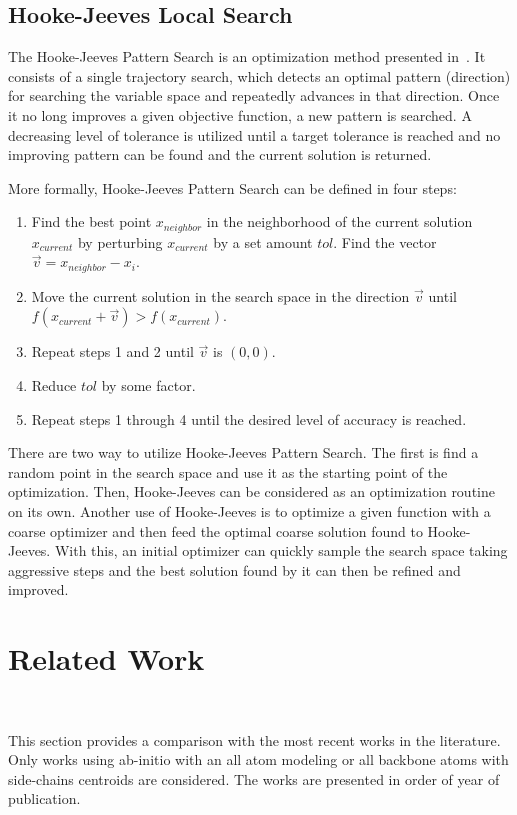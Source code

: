 \subsection{Hooke-Jeeves Local Search}

The Hooke-Jeeves Pattern Search is an optimization method presented
in~\cite{hooke1961direct}. It consists of a single trajectory search, which
detects an optimal pattern (direction) for searching the variable space and
repeatedly advances in that direction. Once it no long improves a given
objective function, a new pattern is searched. A decreasing level of tolerance
is utilized until a target tolerance is reached and no improving pattern can be
found and the current solution is returned.

More formally, Hooke-Jeeves Pattern Search can be defined in four steps:
\begin{enumerate}
    \item Find the best point $x_{neighbor}$ in the neighborhood of the current
    solution $x_{current}$ by perturbing $x_{current}$ by a set amount $tol$.
    Find the vector $\vec{v} = x_{neighbor} - x_i$.
    \item Move the current solution in the search space in the direction $\vec{v}$
    until $f(x_{current} + \vec{v}) > f(x_{current})$.
    \item Repeat steps 1 and 2 until $\vec{v}$ is $(0, 0)$.
    \item Reduce $tol$ by some factor.
    \item Repeat steps 1 through 4 until the desired level of accuracy is reached.
\end{enumerate}

There are two way to utilize Hooke-Jeeves Pattern Search. The first is find a
random point in the search space and use it as the starting point of the optimization.
Then, Hooke-Jeeves can be considered as an optimization routine on its own. Another
use of Hooke-Jeeves is to optimize a given function with a coarse optimizer and then
feed the optimal coarse solution found to Hooke-Jeeves. With this, an initial
optimizer can quickly sample the search space taking aggressive steps and the best
solution found by it can then be refined and improved.

\section{Related Work}~\label{sec:related_works}

This section provides a comparison with the most recent works in the literature.
Only works using ab-initio with an all atom modeling or all backbone atoms with
side-chains centroids are considered. The works are presented in order of year
of publication.


